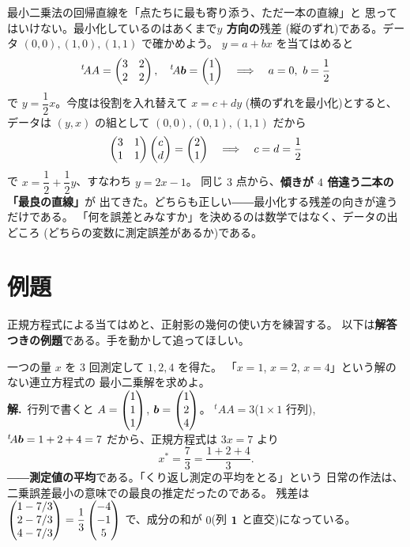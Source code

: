 \begin{hanrei}\label{hanrei:lsq-swap}
最小二乗法の回帰直線を「点たちに最も寄り添う、ただ一本の直線」と
思ってはいけない。最小化しているのはあくまで\textbf{$y$ 方向の}残差
(縦のずれ)である。データ $(0, 0), (1, 0), (1, 1)$ で確かめよう。
$y = a + bx$ を当てはめると
\[
{}^t\!AA = \begin{pmatrix}3 & 2 \\ 2 & 2\end{pmatrix}, \quad {}^t\!A\bm{b} = \begin{pmatrix}1 \\ 1\end{pmatrix}
\quad\Longrightarrow\quad a = 0,\ b = \frac{1}{2}
\]
で $y = \dfrac{1}{2}x$。今度は役割を入れ替えて $x = c + dy$
(横のずれを最小化)とすると、データは $(y, x)$ の組として
$(0,0), (0,1), (1,1)$ だから
\[
\begin{pmatrix}3 & 1 \\ 1 & 1\end{pmatrix}\begin{pmatrix}c \\ d\end{pmatrix} = \begin{pmatrix}2 \\ 1\end{pmatrix}
\quad\Longrightarrow\quad c = d = \frac{1}{2}
\]
で $x = \dfrac{1}{2} + \dfrac{1}{2}y$、すなわち $y = 2x - 1$。
同じ $3$ 点から、\textbf{傾きが $4$ 倍違う二本の「最良の直線」}が
出てきた。どちらも正しい――最小化する残差の向きが違うだけである。
「何を誤差とみなすか」を決めるのは数学ではなく、データの出どころ
(どちらの変数に測定誤差があるか)である。
\end{hanrei}

\section{例題}

正規方程式による当てはめと、正射影の幾何の使い方を練習する。
以下は\textbf{解答つきの例題}である。手を動かして追ってほしい。

\begin{rei}[例題・基本(平均は最小二乗解)]\label{rei:lsq-mean}
一つの量 $x$ を $3$ 回測定して $1, 2, 4$ を得た。
「$x = 1$, $x = 2$, $x = 4$」という解のない連立方程式の
最小二乗解を求めよ。\\
\textbf{解.}\ 行列で書くと
$A = \begin{pmatrix}1 \\ 1 \\ 1\end{pmatrix}$, $\bm{b} = \begin{pmatrix}1 \\ 2 \\ 4\end{pmatrix}$。
${}^t\!AA = 3$($1 \times 1$ 行列), ${}^t\!A\bm{b} = 1 + 2 + 4 = 7$
だから、正規方程式は $3x = 7$ より
\[
x^* = \frac{7}{3} = \frac{1 + 2 + 4}{3}.
\]
――\textbf{測定値の平均}である。「くり返し測定の平均をとる」という
日常の作法は、二乗誤差最小の意味での最良の推定だったのである。
残差は $\begin{pmatrix}1 - 7/3 \\ 2 - 7/3 \\ 4 - 7/3\end{pmatrix} = \dfrac{1}{3}\begin{pmatrix}-4 \\ -1 \\ 5\end{pmatrix}$
で、成分の和が $0$(列 $\bm{1}$ と直交)になっている。
\end{rei}


